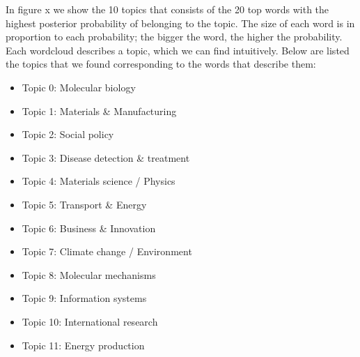 \documentclass[12pt]{report}
\begin{document}
In figure x we show the 10 topics that consists of the 20 top words with the
highest posterior probability of belonging to the topic. The size of each word
is in proportion to each probability; the bigger the word, the higher the
probability. Each wordcloud describes a topic, which we can find intuitively.
Below are listed the topics that we found corresponding to the words that
describe them:
\begin{itemize}
\item[] Topic 0: Molecular biology
\item[] Topic 1: Materials \& Manufacturing
\item[] Topic 2: Social policy
\item[] Topic 3: Disease detection \& treatment
\item[] Topic 4: Materials science / Physics
\item[] Topic 5: Transport \& Energy
\item[] Topic 6: Business \& Innovation
\item[] Topic 7: Climate change / Environment
\item[] Topic 8: Molecular mechanisms
\item[] Topic 9: Information systems
\item[] Topic 10: International research
\item[] Topic 11: Energy production
\end{itemize}
\end{document}
